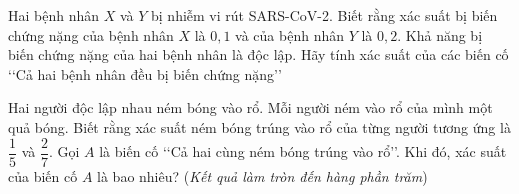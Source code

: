 \begin{ex}%
	Hai bệnh nhân $X$ và $Y$ bị nhiễm vi rút SARS-CoV-2. Biết rằng xác suất bị biến chứng nặng của bệnh nhân $X$ là $0{,}1$ và của bệnh nhân $Y$ là $0{,}2$. Khả năng bị biến chứng nặng của hai bệnh nhân là độc lập. Hãy tính xác suất của các biến cố \lq\lq Cả hai bệnh nhân đều bị biến chứng nặng\rq\rq
\end{ex}

\begin{ex}%
	Hai người độc lập nhau ném bóng vào rổ. Mỗi người ném vào rổ của mình một quả bóng. Biết rằng xác suất ném bóng trúng vào rổ của từng người tương ứng là $\dfrac{1}{5}$ và $\dfrac{2}{7}$. Gọi $A$ là biến cố \lq\lq Cả hai cùng ném bóng trúng vào rổ\rq\rq. Khi đó, xác suất của biến cố $A$ là bao nhiêu? (\textit{Kết quả làm tròn đến hàng phần trăm})
\end{ex}


